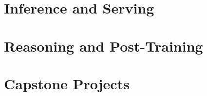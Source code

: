 \documentclass[11pt,twoside,openany]{book}
\begin{document}
\part{Inference and Serving}





\part{Reasoning and Post-Training}











\part{Capstone Projects}









\appendix






\end{document}

